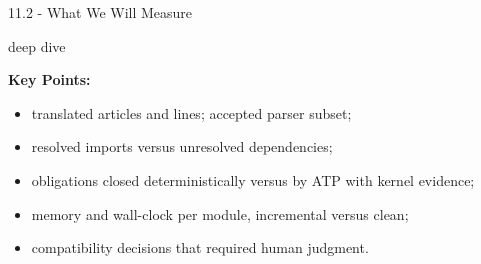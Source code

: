 \documentclass[aspectratio=169,11pt]{beamer}
\newcommand{\deepdivetag}{\hfill\colorbox{black!15}{\textcolor{black!65}{\strut\scriptsize\sffamily deep dive}}}
\begin{document}
\begin{frame}[fragile,t]{11.2 - What We Will Measure\deepdivetag}
\smallskip
\textbf{Key Points:}
\begin{itemize}
\setlength{\itemsep}{1pt}
\setlength{\parsep}{0pt}
\setlength{\parskip}{0pt}
\item translated articles and lines; accepted parser subset;
\item resolved imports versus unresolved dependencies;
\item obligations closed deterministically versus by ATP with kernel evidence;
\item memory and wall-clock per module, incremental versus clean;
\item compatibility decisions that required human judgment.
\end{itemize}
\end{frame}
\end{document}
